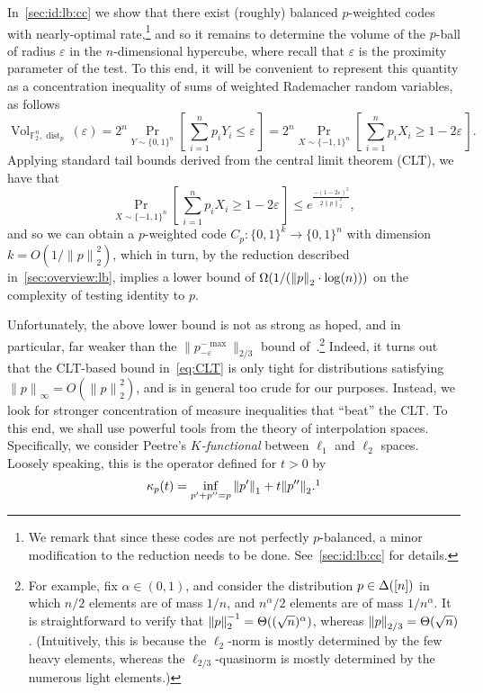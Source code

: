 \documentclass[11pt]{article}
\theoremstyle{remark}   	\newtheorem{remark}[theorem]{Remark}
\theoremstyle{definition}   	\newaliascnt{defn}{theorem}
\newcommand{\eps}{\ensuremath{\varepsilon}\xspace}
\newcommand{\bigTheta}[1]{{\Theta\mleft( #1 \mright)}}
\newcommand{\bigOmega}[1]{{\Omega\mleft( #1 \mright)}}
\newcommand{\proba}{\Pr}
\newcommand{\probaDistrOf}[2]{\proba_{#1}\left[\, #2\, \right]}
\newcommand{\norm}[1]{\lVert#1{\rVert}}
\newcommand{\normone}[1]{{\norm{#1}}_1}
\newcommand{\normtwo}[1]{{\norm{#1}}_2}
\newcommand{\norminf}[1]{{\norm{#1}}_\infty}
\newcommand{\lp}[1][1]{\ell_{#1}}
\newcommand{\kf}[1]{\kappa_{#1}}
\newcommand{\bitset}{\ensuremath{\{0,1\}}}
\newcommand{\pdistfunc}[1][p]{\operatorname{dist}_{#1}}
\begin{document}
 In~\autoref{sec:id:lb:cc} we show that there exist (roughly) balanced $p$-weighted codes with nearly-optimal rate,\footnote{We remark that since these codes are not perfectly $p$-balanced, a minor modification to the reduction needs to be done. See~\autoref{sec:id:lb:cc} for details.} and so it remains to determine the volume of the $p$-ball of radius $\eps$ in the $n$-dimensional hypercube, where recall that $\eps$ is the proximity parameter of the test. To this end, it will be convenient to represent this quantity as a concentration inequality of sums of weighted Rademacher random variables, as follows
   \begin{equation}
   \label{eq:Vol:overview}
    \operatorname{Vol}_{\mathbb{F}_2^n,\pdistfunc[p]}(\eps)
        = 2^n \probaDistrOf{Y \sim \bitset^n }{ \sum_{i=1}^n p_i Y_i \leq \eps } 
        = 2^n \probaDistrOf{X \sim \{-1,1\}^n }{ \sum_{i=1}^n p_i X_i \geq 1-2\eps}. 
  \end{equation}
    Applying standard tail bounds derived from the central limit theorem (CLT), we have that
   \begin{equation}
   \label{eq:CLT}
 \probaDistrOf{X \sim \{-1,1\}^n }{ \sum_{i=1}^n p_i X_i \geq 1-2\eps} \le e^{\frac{-(1-2\eps)^2}{2\normtwo{p}^2}},
  \end{equation}
  and so we can obtain a $p$-weighted code $C_p\colon\bitset^k \to \bitset^n$ with dimension $k = O(1/\normtwo{p}^2)$, which in turn, by the reduction described in~\autoref{sec:overview:lb}, implies a lower bound of $\bigOmega{1/(\normtwo{p} \cdot \log(n))}$ on the complexity of testing identity to $p$.
  
  Unfortunately, the above lower bound is not as strong as hoped, and in particular, far weaker than the $\norm{p^{-\max}_{-\eps}}_{2/3}$ bound of~\cite{VV:14}.\footnote{For example, fix $\alpha \in (0,1)$, and consider the distribution $p\in\Delta\!\left([n]\right)$ in which $n/2$ elements are of mass $1/n$, and $n^{\alpha}/2$ elements are of mass $1/n^{\alpha}$. It is straightforward to verify that $\normtwo{p}^{-1} = \bigTheta{(\sqrt{n})^{\alpha}}$, whereas $\norm{p}_{2/3} = \bigTheta{\sqrt{n}}$. (Intuitively, this is because the $\lp[2]$-norm is mostly determined by the few heavy elements, whereas the $\lp[2/3]$-quasinorm is mostly determined by the numerous light elements.)} Indeed, it turns out that the CLT-based bound in~\autoref{eq:CLT} is only tight for distributions satisfying $\norminf{p} = O(\normtwo{p}^2)$, and is in general too crude for our purposes.
   Instead, we look for stronger concentration of measure inequalities that ``beat'' the CLT. To this end, we shall use powerful tools from the theory of interpolation spaces. Specifically, we consider Peetre's \emph{$K$-functional} between $\lp[1]$ and $\lp[2]$ spaces. Loosely speaking, this is the operator defined for $t>0$ by
\begin{equation*}
    \kf{p}(t) = \inf_{ p'+ p'' =p} \normone{p'} + t\normtwo{p''}.\footnotemark
\end{equation*}
\end{document}
